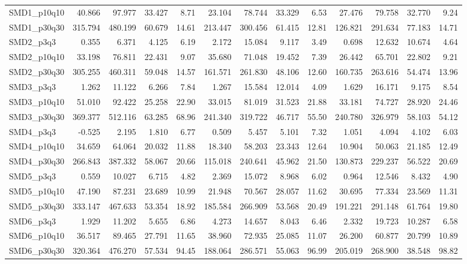 \begin{longtable}{lrrrrrrrrrrrr}
SMD1\_p10q10 & 40.866 & 97.977 & 33.427 & 8.71 & 23.104 & 78.744 & 33.329 & 6.53 & 27.476 & 79.758 & 32.770 & 9.24 \\
SMD1\_p30q30 & 315.794 & 480.199 & 60.679 & 14.61 & 213.447 & 300.456 & 61.415 & 12.81 & 126.821 & 291.634 & 77.183 & 14.71 \\
SMD2\_p3q3 & 0.355 & 6.371 & 4.125 & 6.19 & 2.172 & 15.084 & 9.117 & 3.49 & 0.698 & 12.632 & 10.674 & 4.64 \\
SMD2\_p10q10 & 33.198 & 76.811 & 22.431 & 9.07 & 35.680 & 71.048 & 19.452 & 7.39 & 26.442 & 65.701 & 22.802 & 9.21 \\
SMD2\_p30q30 & 305.255 & 460.311 & 59.048 & 14.57 & 161.571 & 261.830 & 48.106 & 12.60 & 160.735 & 263.616 & 54.474 & 13.96 \\
SMD3\_p3q3 & 1.262 & 11.122 & 6.266 & 7.84 & 1.267 & 15.584 & 12.014 & 4.09 & 1.629 & 16.171 & 9.175 & 8.54 \\
SMD3\_p10q10 & 51.010 & 92.422 & 25.258 & 22.90 & 33.015 & 81.019 & 31.523 & 21.88 & 33.181 & 74.727 & 28.920 & 24.46 \\
SMD3\_p30q30 & 369.377 & 512.116 & 63.285 & 68.96 & 241.340 & 319.722 & 46.717 & 55.50 & 240.780 & 326.979 & 58.103 & 54.12 \\
SMD4\_p3q3 & -0.525 & 2.195 & 1.810 & 6.77 & 0.509 & 5.457 & 5.101 & 7.32 & 1.051 & 4.094 & 4.102 & 6.03 \\
SMD4\_p10q10 & 34.659 & 64.064 & 20.032 & 11.88 & 18.340 & 58.203 & 23.343 & 12.64 & 10.904 & 50.063 & 21.185 & 12.49 \\
SMD4\_p30q30 & 266.843 & 387.332 & 58.067 & 20.66 & 115.018 & 240.641 & 45.962 & 21.50 & 130.873 & 229.237 & 56.522 & 20.69 \\
SMD5\_p3q3 & 0.559 & 10.027 & 6.715 & 4.82 & 2.369 & 15.072 & 8.968 & 6.02 & 0.964 & 12.546 & 8.432 & 4.90 \\
SMD5\_p10q10 & 47.190 & 87.231 & 23.689 & 10.99 & 21.948 & 70.567 & 28.057 & 11.62 & 30.695 & 77.334 & 23.569 & 11.31 \\
SMD5\_p30q30 & 333.147 & 467.633 & 53.354 & 18.92 & 185.584 & 266.909 & 53.568 & 20.49 & 191.221 & 291.148 & 61.764 & 19.80 \\
SMD6\_p3q3 & 1.929 & 11.202 & 5.655 & 6.86 & 4.273 & 14.657 & 8.043 & 6.46 & 2.332 & 19.723 & 10.287 & 6.58 \\
SMD6\_p10q10 & 36.517 & 89.465 & 27.791 & 11.65 & 38.960 & 72.935 & 25.085 & 11.07 & 26.200 & 60.877 & 20.799 & 10.89 \\
SMD6\_p30q30 & 320.364 & 476.270 & 57.534 & 94.45 & 188.064 & 286.571 & 55.063 & 96.99 & 205.019 & 268.900 & 38.548 & 98.82 \\

\end{longtable}
